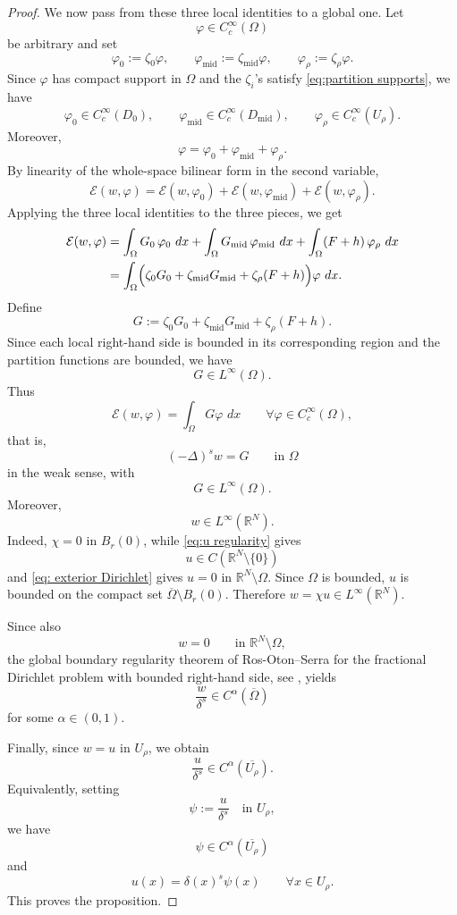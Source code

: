 \documentclass[11pt,a4paper]{article}
\newcommand{\dd}{\,d}
\begin{document}
\begin{proof}
We now pass from these three local identities to a global one. Let
\[
\varphi\in C_c^\infty(\Omega)
\]
be arbitrary and set
\[
\varphi_0:=\zeta_0\varphi,
\qquad
\varphi_{\mathrm{mid}}:=\zeta_{\mathrm{mid}}\varphi,
\qquad
\varphi_\rho:=\zeta_\rho\varphi.
\]
Since \(\varphi\) has compact support in \(\Omega\) and the \(\zeta_i\)'s satisfy \eqref{eq:partition supports}, we have
\[
\varphi_0\in C_c^\infty(D_0),
\qquad
\varphi_{\mathrm{mid}}\in C_c^\infty(D_{\mathrm{mid}}),
\qquad
\varphi_\rho\in C_c^\infty(U_\rho).
\]
Moreover,
\[
\varphi=\varphi_0+\varphi_{\mathrm{mid}}+\varphi_\rho.
\]
By linearity of the whole-space bilinear form in the second variable,
\[
\mathcal E(w,\varphi)
=
\mathcal E(w,\varphi_0)
+
\mathcal E(w,\varphi_{\mathrm{mid}})
+
\mathcal E(w,\varphi_\rho).
\]
Applying the three local identities to the three pieces, we get
\[
\begin{aligned}
\mathcal E(w,\varphi)
&=
\int_\Omega G_0\,\varphi_0\,\dd x
+
\int_\Omega G_{\mathrm{mid}}\,\varphi_{\mathrm{mid}}\,\dd x
+
\int_\Omega (F+h)\,\varphi_\rho\,\dd x\\
&=
\int_\Omega
\Bigl(
\zeta_0G_0
+
\zeta_{\mathrm{mid}}G_{\mathrm{mid}}
+
\zeta_\rho(F+h)
\Bigr)\varphi\,\dd x.
\end{aligned}
\]
Define
\[
G:=
\zeta_0G_0
+
\zeta_{\mathrm{mid}}G_{\mathrm{mid}}
+
\zeta_\rho(F+h).
\]
Since each local right-hand side is bounded in its corresponding region and the
partition functions are bounded, we have
\[
G\in L^\infty(\Omega).
\]
Thus
\[
\mathcal E(w,\varphi)=\int_\Omega G\varphi\,\dd x
\qquad
\forall\varphi\in C_c^\infty(\Omega),
\]
that is,
\[
(-\Delta)^s w=G
\qquad\text{in }\Omega
\]
in the weak sense, with
\[
G\in L^\infty(\Omega).
\]
Moreover,
\[
w\in L^\infty(\mathbb R^N).
\]
Indeed, \(\chi=0\) in \(B_r(0)\), while \eqref{eq:u regularity} gives
\[
u\in C(\mathbb R^N\setminus\{0\})
\]
and \eqref{eq: exterior Dirichlet} gives \(u=0\) in \(\mathbb R^N\setminus\Omega\). Since \(\Omega\) is bounded,
\(u\) is bounded on the compact set \(\overline\Omega\setminus B_r(0)\).
Therefore \(w=\chi u\in L^\infty(\mathbb R^N)\).

Since also
\[
w=0\qquad\text{in }\mathbb R^N\setminus\Omega,
\]
the global boundary regularity theorem of Ros-Oton--Serra for the fractional
Dirichlet problem with bounded right-hand side, see
\cite[Theorem 1.2]{RosOtonSerra}, yields
\[
\frac{w}{\delta^s}\in C^\alpha(\overline\Omega)
\]
for some \(\alpha\in(0,1)\).

Finally, since \(w=u\) in \(U_\rho\), we obtain
\[
\frac{u}{\delta^s}\in C^\alpha(\overline{U_\rho}).
\]
Equivalently, setting
\[
\psi:=\frac{u}{\delta^s}\quad\text{in }U_\rho,
\]
we have
\[
\psi\in C^\alpha(\overline{U_\rho})
\]
and
\[
u(x)=\delta(x)^s\psi(x)
\qquad\forall x \in U_\rho.
\]
This proves the proposition.
\end{proof}
\end{document}
